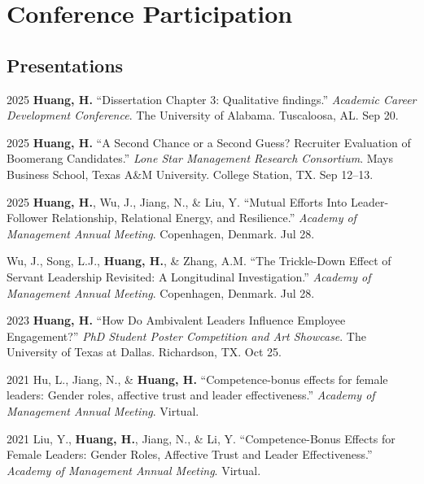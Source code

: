 \documentclass[12pt,letterpaper]{report} %
\begin{document}
    \section*{Conference Participation}

    \subsection*{Presentations}
    
    \begin{tablist}


        \item[2025]\tab{}\textbf{Huang, H.} \enquote{Dissertation Chapter 3: Qualitative findings.} \textit{Academic Career Development Conference}. The University of Alabama. Tuscaloosa, AL. Sep 20.


        \item[2025]\tab{}\textbf{Huang, H.} \enquote{A Second Chance or a Second Guess? Recruiter Evaluation of Boomerang Candidates.} \textit{ Lone Star Management Research Consortium}.  Mays Business School, Texas A\&M University. College Station, TX. Sep 12--13.

        \item[2025]\tab{}\textbf{Huang, H.}, Wu, J., Jiang, N., \& Liu, Y. \enquote{Mutual Efforts Into Leader-Follower Relationship, Relational Energy, and Resilience.} \textit{Academy of Management Annual Meeting}. Copenhagen, Denmark. Jul 28.
        
        \item[ ]\tab{}Wu, J., Song, L.J., \textbf{Huang, H.}, \& Zhang, A.M. \enquote{The Trickle-Down Effect of Servant Leadership Revisited: A Longitudinal Investigation.} \textit{Academy of Management Annual Meeting}. Copenhagen, Denmark. Jul 28.
    
        \item[2023]\tab{}\textbf{Huang, H.} \enquote{How Do Ambivalent Leaders Influence Employee Engagement?} \textit{PhD Student Poster Competition and Art Showcase}. The University of Texas at Dallas. Richardson, TX. Oct 25.

        \item[2021]\tab{}Hu, L., Jiang, N., \& \textbf{Huang, H.} \enquote{Competence-bonus effects for female leaders: Gender roles, affective trust and leader effectiveness.} \textit{Academy of Management Annual Meeting}. Virtual. 
        
        \item[2021]\tab{}Liu, Y., \textbf{Huang, H.}, Jiang, N., \& Li, Y. \enquote{Competence-Bonus Effects for Female Leaders: Gender Roles, Affective Trust and Leader Effectiveness.} \textit{Academy of Management Annual Meeting}. Virtual. 

    \end{tablist}
\end{document}
